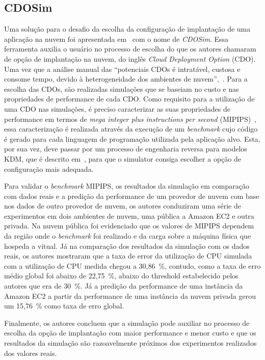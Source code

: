 \subsection{CDOSim}
Uma solução para o desafio da escolha da configuração de implantação de uma aplicação na nuvem foi apresentada em~\cite{fittkau2012cdosim} com o nome de \textit{CDOSim}. Essa ferramenta auxilia o usuário no processo de escolha do que os autores chamaram de opção de implantação na nuvem, do inglês \textit{Cloud Deployment Option} (CDO). Uma vez que a análise manual das ``potenciais CDOs é intratável, custosa e consome tempo, devido à heterogeneidade dos ambientes de nuvem'',~\cite{fittkau2012cdosim}. Para a escolha das CDOs, são realizadas simulações que se baseiam no custo e nas propriedades de performance de cada CDO. Como requisito para a utilização de uma CDO nas simulações, é preciso caracterizar as suas propriedades de performance em termos de \textit{mega integer plus instructions per second} (MIPIPS)~\cite{fittkau2012cdosim}, essa caracterização é realizada através da execução de um \textit{benchmark} cujo código é gerado para cada linguagem de programação utilizada pela aplicação alvo. Esta, por sua vez, deve passar por um processo de engenharia reversa para modelos KDM, que é descrito em~\cite{perez2011knowledge}, para que o simulator consiga escolher a opção de configuração mais adequada.

Para validar o \textit{benchmark} MIPIPS, os resultados da simulação em comparação com dados reais e a predição da performance de um provedor de nuvem com base nos dados de outro provedor de nuvem, os autores conduziram uma série de experimentos em dois ambientes de nuvem, uma pública a Amazon EC2 e outra privada. Na nuvem pública foi evidenciado que os valores de MIPIPS dependem da região onde o \textit{benchmark} foi realizado e da carga sobre a máquina física que hospeda a vitual. Já na comparação dos resultados da simulação com os dados reais, os autores mostraram que a taxa de error da utilização de CPU simulada com a utilização de CPU medida chegou a 30,86~\%, contudo, como a taxa de erro médio global foi abaixo de 22,75~\%, abaixo do threshold estabelecido pelos autores que era de 30~\%. Já a predição da performance de uma instância da Amazon EC2 a partir da performance de uma instância da nuvem privada gerou um 15,76~\% como taxa de erro global.

Finalmente, os autores concluem que a simulação pode auxiliar no processo de escolha da opção de implantação com maior performance e menor custo e que os resultados da simulação são razoavelmente próximos dos experimentos realizados dos valores reais.

